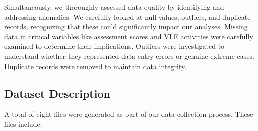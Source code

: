 Simultaneously, we thoroughly assessed data quality by identifying and addressing anomalies. We carefully looked at null values, outliers, and duplicate records, recognizing that these could significantly impact our analyses. Missing data in critical variables like assessment scores and VLE activities were carefully examined to determine their implications. Outliers were investigated to understand whether they represented data entry errors or genuine extreme cases. Duplicate records were removed to maintain data integrity.


\subsection*{Dataset Description}

A total of eight files were generated as part of our data collection process. These files include: 

